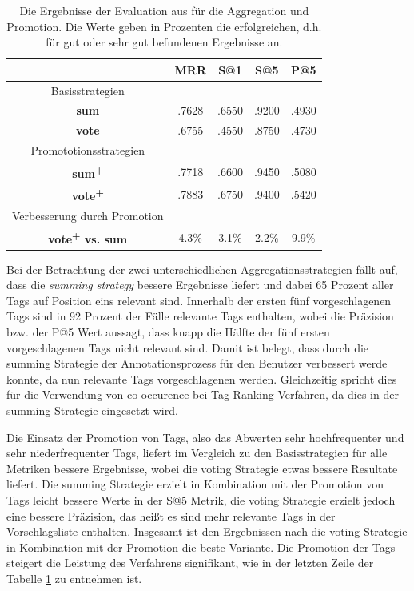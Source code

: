 \begin{table}[htbp]
  \centering
  \begin{tabular}{ccccc}
  \hline
   & \textbf{MRR} & \textbf{S@1} & \textbf{S@5} & \textbf{P@5}\\
  \hline
  Basisstrategien\\
  \textbf{sum} & .7628 & .6550 & .9200 & .4930\\
  \textbf{vote} & .6755 & .4550 & .8750 & .4730\\
  \hline
  Promototionsstrategien\\
  \textbf{sum\textsuperscript{+}} & .7718 & .6600 & .9450 & .5080\\
  \textbf{vote\textsuperscript{+}} & .7883 & .6750 & .9400 & .5420\\
  \hline
  Verbesserung durch Promotion\\
  \textbf{vote\textsuperscript{+} vs. sum} & 4.3\% & 3.1\% & 2.2\% & 9.9\%\\
  \hline
  \end{tabular}
  \caption{Die Ergebnisse der Evaluation aus \cite{collectiveKnowledge} für die Aggregation und Promotion. Die Werte geben in Prozenten die erfolgreichen, d.h. für gut oder sehr gut befundenen Ergebnisse an.}
  \label{tab:strategiesrResultsBjoern}
\end{table}

Bei der Betrachtung der zwei unterschiedlichen Aggregationsstrategien fällt auf, dass die \emph{summing strategy} bessere Ergebnisse liefert und dabei 65 Prozent aller Tags auf Position eins relevant sind. Innerhalb der ersten fünf vorgeschlagenen Tags sind in 92 Prozent der Fälle relevante Tags enthalten, wobei die Präzision bzw. der P@5 Wert aussagt, dass knapp die Hälfte der fünf ersten vorgeschlagenen Tags nicht relevant sind. Damit ist belegt, dass durch die summing Strategie der Annotationsprozess für den Benutzer verbessert werde konnte, da nun relevante Tags vorgeschlagenen werden. Gleichzeitig spricht dies für die Verwendung von co-occurence bei Tag Ranking Verfahren, da dies in der summing Strategie eingesetzt wird.

Die Einsatz der Promotion von Tags, also das Abwerten sehr hochfrequenter und sehr niederfrequenter Tags, liefert im Vergleich zu den Basisstrategien für alle Metriken bessere Ergebnisse, wobei die voting Strategie etwas bessere Resultate liefert. Die summing Strategie erzielt in Kombination mit der Promotion von Tags leicht bessere Werte in der S@5 Metrik, die voting Strategie erzielt jedoch eine bessere Präzision, das heißt es sind mehr relevante Tags in der Vorschlagsliste enthalten. Insgesamt ist den Ergebnissen nach die voting Strategie in Kombination mit der Promotion die beste Variante. Die Promotion der Tags steigert die Leistung des Verfahrens signifikant, wie in der letzten Zeile der Tabelle \ref{tab:strategiesrResultsBjoern} zu entnehmen ist.
 
